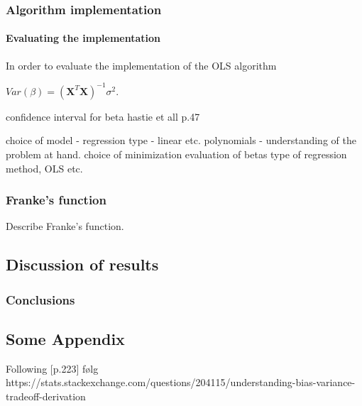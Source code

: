\documentclass[%
oneside,                 %
final,                   %
10pt]{article}
\begin{document}
\begin{comment}
The first term is the variance of the target around its true mean f(x0), and
cannot be avoided no matter how well we estimate f(x0), unless σ2
ε = 0.
The second term is the squared bias, the amount by which the average of
our estimate differs from the true mean; the last term is the variance; the
expected squared deviation of ˆf(x0) around its mean. Typically the more
complex we make the model ˆf, the lower the (squared) bias but the higher
the variance.
\end{comment}


\subsection{Algorithm implementation}

\subsubsection{Evaluating the implementation}
In order to evaluate the implementation of the OLS algorithm

 $Var(\beta)=(\bm{X}^T\bm{X})^{-1} \sigma^2$.

confidence interval for beta hastie et all p.47

choice of model - regression type - linear etc. polynomials - understanding of the problem at hand.
choice of minimization evaluation of betas type of regression method, OLS etc.


\subsection{Franke's function}
Describe Franke's function.
\section{Discussion of results}

\subsection{Conclusions}






\begin{appendices}
\chapter{Some Appendix} \label{APP_1}
Following \citep{HastieTrevor2009TEoS}[p.223]
følg https://stats.stackexchange.com/questions/204115/understanding-bias-variance-tradeoff-derivation

\end{appendices}
\end{document}

